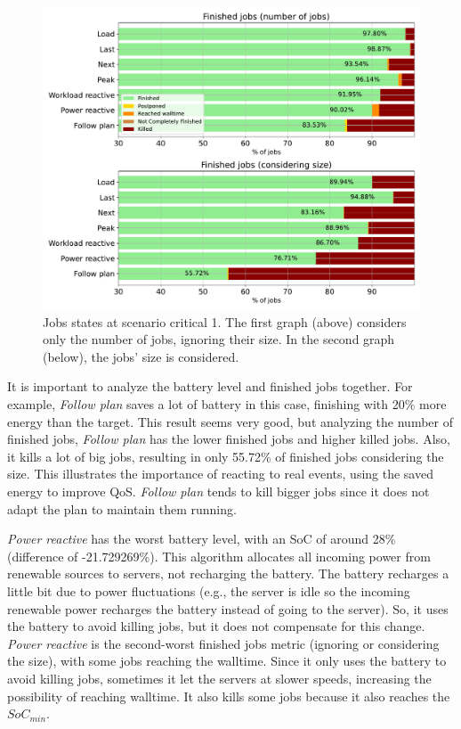 \begin{figure}[!htb]
    \centering
    \includegraphics[scale=0.55]{Images/Compensations/jobs_critical_1.pdf}
    \caption{Jobs states at scenario critical 1. The first graph (above) considers only the number of jobs, ignoring their size. In the second graph (below), the jobs' size is considered.}
    \label{fig:jobs_critical_1}
\end{figure}

It is important to analyze the battery level and finished jobs together. For example, \emph{Follow plan} saves a lot of battery in this case, finishing with 20\% more energy than the target. This result seems very good, but analyzing the number of finished jobs, \emph{Follow plan} has the lower finished jobs and higher killed jobs. Also, it kills a lot of big jobs, resulting in only 55.72\% of finished jobs considering the size. This illustrates the importance of reacting to real events, using the saved energy to improve QoS. \emph{Follow plan} tends to kill bigger jobs since it does not adapt the plan to maintain them running.

\emph{Power reactive} has the worst battery level, with an SoC of around 28\% (difference of -21.729269\%). This algorithm allocates all incoming power from renewable sources to servers, not recharging the battery. The battery recharges a little bit due to power fluctuations (e.g., the server is idle so the incoming renewable power recharges the battery instead of going to the server). So, it uses the battery to avoid killing jobs, but it does not compensate for this change. \emph{Power reactive} is the second-worst finished jobs metric (ignoring or considering the size), with some jobs reaching the walltime. Since it only uses the battery to avoid killing jobs, sometimes it let the servers at slower speeds, increasing the possibility of reaching walltime. It also kills some jobs because it also reaches the $SoC_{min}$.


